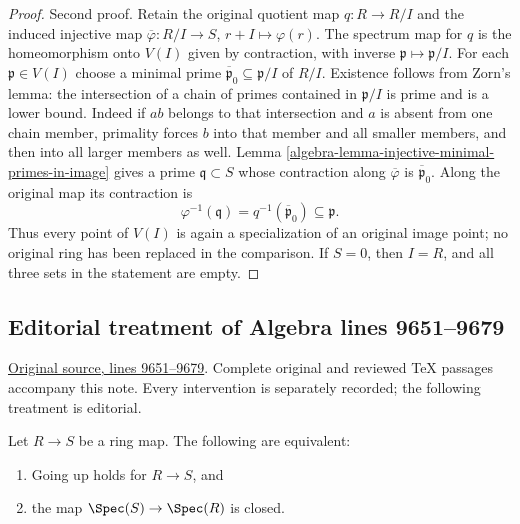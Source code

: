 \begin{proof}
\medskip\noindent
Second proof. Retain the original quotient map
$q:R\to R/I$ and the induced injective map
$\overline\varphi:R/I\to S$, $r+I\mapsto\varphi(r)$.
The spectrum map for $q$ is the homeomorphism onto
$V(I)$ given by contraction, with inverse
$\mathfrak p\mapsto\mathfrak p/I$.
For each $\mathfrak p\in V(I)$ choose a minimal prime
$\overline{\mathfrak p}_0\subseteq\mathfrak p/I$
of $R/I$. Existence follows from Zorn's lemma: the
intersection of a chain of primes contained in
$\mathfrak p/I$ is prime and is a lower bound.
Indeed if $ab$ belongs to that intersection and $a$
is absent from one chain member, primality forces
$b$ into that member and all smaller members, and
then into all larger members as well.
Lemma \ref{algebra-lemma-injective-minimal-primes-in-image}
gives a prime $\mathfrak q\subset S$ whose contraction
along $\overline\varphi$ is $\overline{\mathfrak p}_0$.
Along the original map its contraction is
$$
\varphi^{-1}(\mathfrak q)
=q^{-1}(\overline{\mathfrak p}_0)\subseteq\mathfrak p.
$$
Thus every point of $V(I)$ is again a specialization
of an original image point; no original ring has been
replaced in the comparison. If $S=0$, then $I=R$,
and all three sets in the statement are empty.
\end{proof}


\subsection{Editorial treatment of Algebra lines 9651--9679}

\hypertarget{algebra-context-109}{}

\noindent\href{https://github.com/stacks/stacks-project/blob/a04446e57ec1fbc252a871afcec7752fb2807b14/algebra.tex\#L9651}{Original source, lines 9651--9679}. Complete original and reviewed TeX passages accompany this note. Every intervention is separately recorded; the following treatment is editorial.


\begin{lemma}
\label{editorial-source-lemma-going-up-closed}
Let $R \to S$ be a ring map. The following are equivalent:
\begin{enumerate}
\item Going up holds for $R \to S$, and
\item the map $\Spec(S) \to \Spec(R)$ is closed.
\end{enumerate}
\end{lemma}

